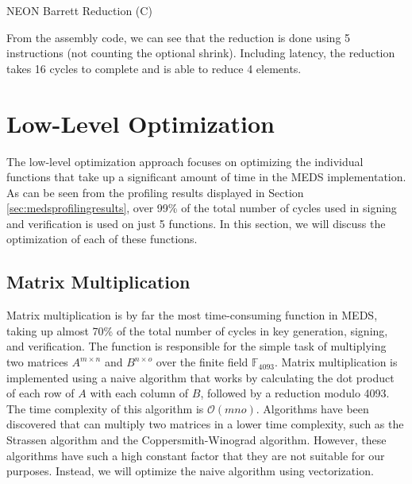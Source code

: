 \documentclass[11pt,a4paper]{report}
\theoremstyle{definition}
\begin{document}
\begin{algorithm}
  \caption{NEON Barrett Reduction (C)}
  \label{alg:neonbarretreductionc}
  
\end{algorithm}

\begin{algorithm}
  \caption{NEON Barrett Reduction (Assembly)}
  \label{alg:neonbarretreductionasm}
  Assembler}, style=ASMStyle]{code/barrett_reduce_asm.s}
\end{algorithm}

From the assembly code, we can see that the reduction is done using 5 instructions (not counting the optional shrink). Including latency, the reduction takes 16 cycles to complete and is able to reduce 4 elements.

\section{Low-Level Optimization}
\label{sec:lowleveloptimization}
The low-level optimization approach focuses on optimizing the individual functions that take up a significant amount of time in the MEDS implementation. As can be seen from the profiling results displayed in Section \ref{sec:medsprofilingresults}, over 99\% of the total number of cycles used in signing and verification is used on just 5 functions. In this section, we will discuss the optimization of each of these functions.

\subsection{Matrix Multiplication}
\label{sec:matrixmultiplication}
Matrix multiplication is by far the most time-consuming function in MEDS, taking up almost 70\% of the total number of cycles in key generation, signing, and verification. The function is responsible for the simple task of multiplying two matrices $A^{m \times n}$ and $B^{n \times o}$ over the finite field $\mathbb{F}_{4093}$. Matrix multiplication is implemented using a naive algorithm that works by calculating the dot product of each row of $A$ with each column of $B$, followed by a reduction modulo 4093. The time complexity of this algorithm is $\mathcal{O}(mno)$. Algorithms have been discovered that can multiply two matrices in a lower time complexity, such as the Strassen algorithm and the Coppersmith-Winograd algorithm. However, these algorithms have such a high constant factor that they are not suitable for our purposes. Instead, we will optimize the naive algorithm using vectorization.
\end{document}
